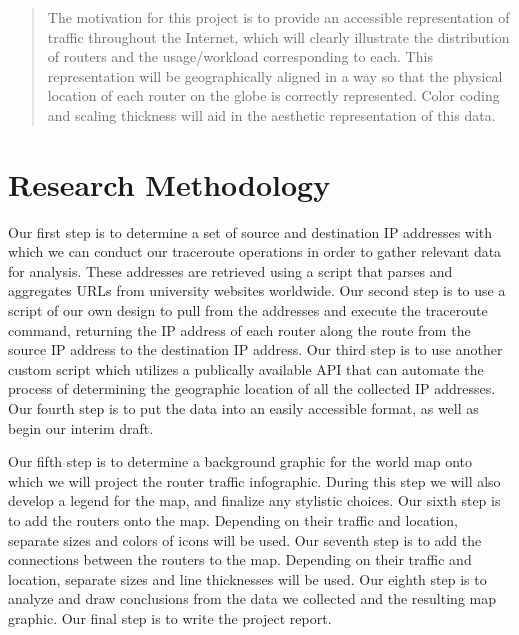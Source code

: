 \documentclass{sigcomm-alternate}
\begin{document}
\date{February 4 2015}

\maketitle

\begin{abstract}
    The motivation for this project is to provide an accessible representation of traffic throughout the Internet, which will clearly illustrate the distribution of routers and the usage/workload corresponding to each. This representation will be geographically aligned in a way so that the physical location of each router on the globe is correctly represented. Color coding and scaling thickness will aid in the aesthetic representation of this data.
\end{abstract}

\section{Research Methodology}

Our first step is to determine a set of source and destination IP addresses with which we can conduct our traceroute operations in order to gather relevant data for analysis. These addresses are retrieved using a script that parses and aggregates URLs from university websites worldwide. Our second step is to use a script of our own design to pull from the addresses and execute the traceroute command, returning the IP address of each router along the route from the source IP address to the destination IP address. Our third step is to use another custom script which utilizes a publically available API that can automate the process of determining the geographic location of all the collected IP addresses. Our fourth step is to put the data into an easily accessible format, as well as begin our interim draft.  

Our fifth step is to determine a background graphic for the world map onto which we will project the router traffic infographic. During this step we will also develop a legend for the map, and finalize any stylistic choices. Our sixth step is to add the routers onto the map. Depending on their traffic and location, separate sizes and colors of icons will be used. Our seventh step is to add the connections between the routers to the map. Depending on their traffic and location, separate sizes and line thicknesses will be used. Our eighth step is to analyze and draw conclusions from the data we collected and the resulting map graphic. Our final step is to write the project report.
\end{document}
